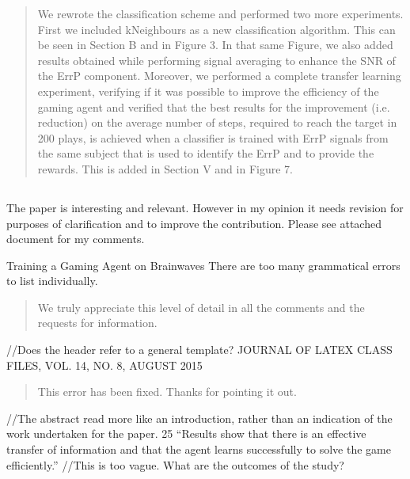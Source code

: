 \documentclass[journal,onecolumn,12pt]{IEEEtran}
\begin{document}
\begin{quotation}
{\color{blue}
We rewrote the classification scheme and performed two more experiments.  First we included kNeighbours as a new classification algorithm.  This can be seen in Section B and in Figure 3.  In that same Figure, we also added results obtained while performing signal averaging to enhance the SNR of the ErrP component. Moreover, we performed a complete transfer learning experiment, verifying if it was possible to improve the efficiency of the gaming agent and verified that the best results for the improvement (i.e. reduction) on the average number of steps, required to reach the target in 200 plays, is achieved when a classifier is trained with ErrP signals from the same subject that is used to identify the ErrP and to provide the rewards.    This is added in Section V and in Figure 7.
}
\end{quotation}

\subsection*{}
The paper is interesting and relevant. However in my opinion it needs revision for purposes of clarification and to improve the contribution.
Please see attached document for my comments.

Training a Gaming Agent on Brainwaves
There are too many grammatical errors to list individually.

\vspace{2em}
\begin{quotation}
{\color{blue}
We truly appreciate this level of detail in all the comments and the requests for information. 
}
\end{quotation}
\vspace{2em}

//Does the header refer to a general template?
JOURNAL OF LATEX CLASS FILES, VOL. 14, NO. 8, AUGUST 2015

\vspace{2em}
\begin{quotation}
{\color{blue}
This error has been fixed.  Thanks for pointing it out.
}
\end{quotation}
\vspace{2em}

//The abstract read more like an introduction, rather than an indication of the work undertaken for the paper.
25 “Results show that there is an effective transfer of information and that
the agent learns successfully to solve the game efficiently.”
//This is too vague. What are the outcomes of the study?
\end{document}
